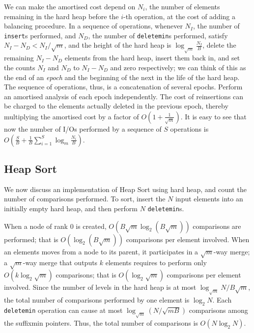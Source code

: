We can make the amortised cost depend on $N_i$, the number
of elements remaining in the hard heap before the $i$-th operation, at the cost
of adding a balancing procedure.
In a sequence of operations, whenever $N_I$, the number of {\tt insert}s performed, and $N_D$, 
	the number of {\tt deletemin}s performed, satisfy $N_I - N_D < N_I / \sqrt{m}$,
	and the height of the hard heap is $\log_{\sqrt{m}} \frac{N_I}{B}$, 
	delete the remaining $N_I - N_D$ elements from the hard heap,  insert them back in,
	and set the counts $N_I$ and $N_D$ to $N_I-N_D$ and zero respectively;
	we can think of this as the end of an {\em epoch} and the beginning of the next in
	the life of the hard heap. 
The sequence of operations, thus, is a concatenation of several epochs.
Perform an amortised analysis of each epoch independently. 
The cost of reinsertions can be charged to the elements actually deleted in the previous
	epoch, thereby multiplying the amortised cost
	by a factor of $O(1+\frac{1}{\sqrt{m}})$.
It is easy to see that now the number of
I/Os performed by a sequence of $S$ operations is
$O(\frac{S}{B}+\frac{1}{B}\sum_{i = 1}^{S} \log_{m}\frac{N_i}{B})$.


\subsection{Heap Sort}
We now discuss an implementation of Heap Sort using hard heap, and
count the number of comparisons performed.
To sort, insert the $N$ input elements into an initially empty hard heap, and 
then perform $N$ {\tt deletemin}s.

When a node of rank $0$ is created, $O(B\sqrt{m} \log_2 (B\sqrt{m}))$ comparisons are performed;
that is $O(\log_2 (B\sqrt{m}))$ comparisons per element involved.
When an elements moves from a node to its parent, it participates in a $\sqrt{m}$-way merge;
	a $\sqrt{m}$-way merge that outputs $k$ elements requires to perform only
	$O(k\log_2 \sqrt{m})$ comparisons; that is $O(\log_2 \sqrt{m})$ comparisons per element involved.
Since the number of levels in the hard heap is at most $\log_{\sqrt{m}} N/B\sqrt{m}$, the total
	number of comparisons performed by one element is $\log_2 N$.
Each {\tt deletemin} operation can cause at most $\log_{\sqrt{m}} (N/\sqrt{mB})$ comparisons
	among the suffixmin pointers.
Thus, the total number of comparisons is $O(N \log_2 N)$. 
